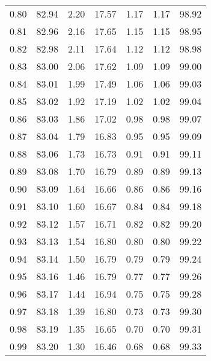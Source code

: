 \begin{tabular}{|c|c|c|c|c|c|c|}
      0.80 &     82.94 &      2.20 &      17.57 &    1.17 &       1.17 &         98.92 \\
      0.81 &     82.96 &      2.16 &      17.65 &    1.15 &       1.15 &         98.95 \\
      0.82 &     82.98 &      2.11 &      17.64 &    1.12 &       1.12 &         98.98 \\
      0.83 &     83.00 &      2.06 &      17.62 &    1.09 &       1.09 &         99.00 \\
      0.84 &     83.01 &      1.99 &      17.49 &    1.06 &       1.06 &         99.03 \\
      0.85 &     83.02 &      1.92 &      17.19 &    1.02 &       1.02 &         99.04 \\
      0.86 &     83.03 &      1.86 &      17.02 &    0.98 &       0.98 &         99.07 \\
      0.87 &     83.04 &      1.79 &      16.83 &    0.95 &       0.95 &         99.09 \\
      0.88 &     83.06 &      1.73 &      16.73 &    0.91 &       0.91 &         99.11 \\
      0.89 &     83.08 &      1.70 &      16.79 &    0.89 &       0.89 &         99.13 \\
      0.90 &     83.09 &      1.64 &      16.66 &    0.86 &       0.86 &         99.16 \\
      0.91 &     83.10 &      1.60 &      16.67 &    0.84 &       0.84 &         99.18 \\
      0.92 &     83.12 &      1.57 &      16.71 &    0.82 &       0.82 &         99.20 \\
      0.93 &     83.13 &      1.54 &      16.80 &    0.80 &       0.80 &         99.22 \\
      0.94 &     83.14 &      1.50 &      16.79 &    0.79 &       0.79 &         99.24 \\
      0.95 &     83.16 &      1.46 &      16.79 &    0.77 &       0.77 &         99.26 \\
      0.96 &     83.17 &      1.44 &      16.94 &    0.75 &       0.75 &         99.28 \\
      0.97 &     83.18 &      1.39 &      16.80 &    0.73 &       0.73 &         99.30 \\
      0.98 &     83.19 &      1.35 &      16.65 &    0.70 &       0.70 &         99.31 \\
      0.99 &     83.20 &      1.30 &      16.46 &    0.68 &       0.68 &         99.33 \\
\bottomrule
\end{tabular}
